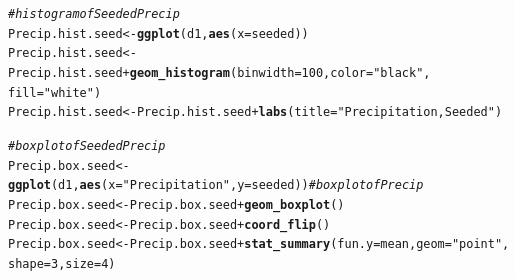 \documentclass{article}\usepackage[]{graphicx}\usepackage[]{color}
\makeatletter
\newcommand{\hlnum}[1]{\textcolor[rgb]{0.686,0.059,0.569}{#1}}%
\newcommand{\hlstr}[1]{\textcolor[rgb]{0.192,0.494,0.8}{#1}}%
\newcommand{\hlcom}[1]{\textcolor[rgb]{0.678,0.584,0.686}{\textit{#1}}}%
\newcommand{\hlopt}[1]{\textcolor[rgb]{0,0,0}{#1}}%
\newcommand{\hlstd}[1]{\textcolor[rgb]{0.345,0.345,0.345}{#1}}%
\newcommand{\hlkwb}[1]{\textcolor[rgb]{0.69,0.353,0.396}{#1}}%
\newcommand{\hlkwc}[1]{\textcolor[rgb]{0.333,0.667,0.333}{#1}}%
\newcommand{\hlkwd}[1]{\textcolor[rgb]{0.737,0.353,0.396}{\textbf{#1}}}%
\newenvironment{kframe}{%
 \def\at@end@of@kframe{}%
 \ifinner\ifhmode%
  \def\at@end@of@kframe{\end{minipage}}%
  \begin{minipage}{\columnwidth}%
 \fi\fi%
 \def\FrameCommand##1{\hskip\@totalleftmargin \hskip-\fboxsep
 \colorbox{shadecolor}{##1}\hskip-\fboxsep
     \hskip-\linewidth \hskip-\@totalleftmargin \hskip\columnwidth}%
 \MakeFramed {\advance\hsize-\width
   \@totalleftmargin\z@ \linewidth\hsize
   \@setminipage}}%
 {\par\unskip\endMakeFramed%
 \at@end@of@kframe}
\newenvironment{knitrout}{}{} %
\makeatother
\begin{document}

\begin{knitrout}
\color{fgcolor}\begin{kframe}
\begin{alltt}
\hlcom{# histogram of Seeded Precip}
\hlstd{Precip.hist.seed} \hlkwb{<-} \hlkwd{ggplot}\hlstd{(d1,} \hlkwd{aes}\hlstd{(}\hlkwc{x} \hlstd{= seeded))}
\hlstd{Precip.hist.seed} \hlkwb{<-} \hlstd{Precip.hist.seed} \hlopt{+} \hlkwd{geom_histogram}\hlstd{(}\hlkwc{binwidth} \hlstd{=} \hlnum{100}\hlstd{,}\hlkwc{color} \hlstd{=} \hlstr{"black"}\hlstd{,}
                                            \hlkwc{fill} \hlstd{=} \hlstr{"white"}\hlstd{)}
\hlstd{Precip.hist.seed} \hlkwb{<-} \hlstd{Precip.hist.seed} \hlopt{+} \hlkwd{labs}\hlstd{(}\hlkwc{title} \hlstd{=} \hlstr{"Precipitation, Seeded"}\hlstd{)}

\hlcom{# boxplot of Seeded Precip}
\hlstd{Precip.box.seed} \hlkwb{<-} \hlkwd{ggplot}\hlstd{(d1,} \hlkwd{aes}\hlstd{(}\hlkwc{x} \hlstd{=} \hlstr{"Precipitation"}\hlstd{,}\hlkwc{y} \hlstd{= seeded))} \hlcom{# boxplot of Precip}
\hlstd{Precip.box.seed} \hlkwb{<-} \hlstd{Precip.box.seed} \hlopt{+} \hlkwd{geom_boxplot}\hlstd{()}
\hlstd{Precip.box.seed} \hlkwb{<-} \hlstd{Precip.box.seed} \hlopt{+} \hlkwd{coord_flip}\hlstd{()}
\hlstd{Precip.box.seed} \hlkwb{<-} \hlstd{Precip.box.seed} \hlopt{+} \hlkwd{stat_summary}\hlstd{(}\hlkwc{fun.y} \hlstd{= mean,} \hlkwc{geom} \hlstd{=} \hlstr{"point"}\hlstd{,}
                                        \hlkwc{shape} \hlstd{=} \hlnum{3}\hlstd{,} \hlkwc{size} \hlstd{=} \hlnum{4}\hlstd{)}
\end{alltt}
\end{kframe}
\end{knitrout}
\end{document}
